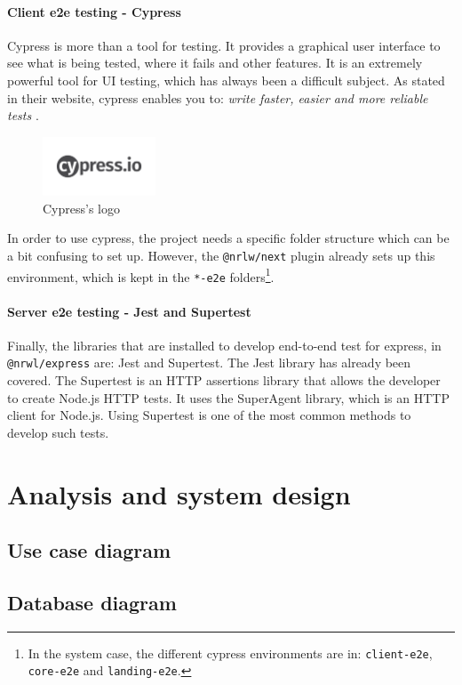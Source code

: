 \documentclass[a4paper, 12pt, oneside]{book}
\begin{document}
\subsubsection{Client e2e testing - Cypress}
Cypress is more than a tool for testing. It provides a graphical user interface to see what is being tested, where it fails and other features. It is an extremely powerful tool for UI testing, which has always been a difficult subject. As stated in their website, cypress enables you to: \emph{write faster, easier and more reliable tests} \cite{cypress}.
\begin{figure}[H]
	\centering
	\includegraphics[width=0.3\textwidth]{assets/cypress-logo.png}
	\caption{Cypress's logo}
\end{figure}
In order to use cypress, the project needs a specific folder structure which can be a bit confusing to set up. However, the \texttt{@nrlw/next} plugin already sets up this environment, which is kept in the \texttt{*-e2e} folders\footnote{In the system case, the different cypress environments are in: \texttt{client-e2e}, \texttt{core-e2e} and \texttt{landing-e2e}.}.
\subsubsection{Server e2e testing - Jest and Supertest}
Finally, the libraries that are installed to develop end-to-end test for express, in \texttt{@nrwl/express} are: Jest and Supertest. The Jest library has already been covered. The Supertest is an HTTP assertions library that allows the developer to create Node.js HTTP tests. It uses the SuperAgent library, which is an HTTP client for Node.js. Using Supertest is one of the most common methods to develop such tests.
\chapter{Analysis and system design}
\section{Use case diagram}
\section{Database diagram}
\end{document}
